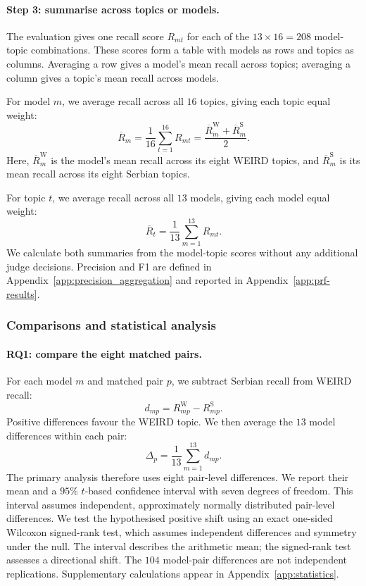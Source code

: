 \documentclass[11pt,a4paper]{article}
\begin{document}
\paragraph{Step 3: summarise across topics or models.}
The evaluation gives one recall score $R_{mt}$ for each of the
$13\times16=208$ model-topic combinations. These scores form a
table with models as rows and topics as columns. Averaging a row
gives a model's mean recall across topics; averaging a column
gives a topic's mean recall across models.

For model $m$, we average recall across all $16$ topics,
giving each topic equal weight:
\begin{equation}
\overline R_m=\frac{1}{16}\sum_{t=1}^{16}R_{mt}
=\frac{\overline R_m^{\mathrm W}+\overline R_m^{\mathrm S}}{2}.
\label{eq:model-recall}
\end{equation}
Here, $\overline R_m^{\mathrm W}$ is the model's mean recall
across its eight WEIRD topics, and $\overline R_m^{\mathrm S}$
is its mean recall across its eight Serbian topics.

For topic $t$, we average recall across all $13$ models,
giving each model equal weight:
\[
\overline R_t=\frac{1}{13}\sum_{m=1}^{13}R_{mt}.
\]
We calculate both summaries from the model-topic scores without
any additional judge decisions. Precision and F1 are defined in
Appendix~\ref{app:precision_aggregation} and reported in
Appendix~\ref{app:prf-results}.

\subsubsection{Comparisons and statistical analysis}
\label{sec:statistics}

\paragraph{RQ1: compare the eight matched pairs.}
For each model $m$ and matched pair $p$, we subtract Serbian recall from WEIRD recall:
\begin{equation}
d_{mp}=R_{mp}^{\mathrm W}-R_{mp}^{\mathrm S}.
\label{eq:pair-gap}
\end{equation}
Positive differences favour the WEIRD topic. We then average the $13$ model differences within each pair:
\begin{equation}
\Delta_p=\frac{1}{13}\sum_{m=1}^{13}d_{mp}.
\label{eq:pair-mean}
\end{equation}
The primary analysis therefore uses eight pair-level differences. We report their mean and a $95\%$ $t$-based confidence interval with seven degrees of freedom. This interval assumes independent, approximately normally distributed pair-level differences. We test the hypothesised positive shift using an exact one-sided Wilcoxon signed-rank test, which assumes independent differences and symmetry under the null. The interval describes the arithmetic mean; the signed-rank test assesses a directional shift. The $104$ model-pair differences are not independent replications. Supplementary calculations appear in Appendix~\ref{app:statistics}.
\end{document}
